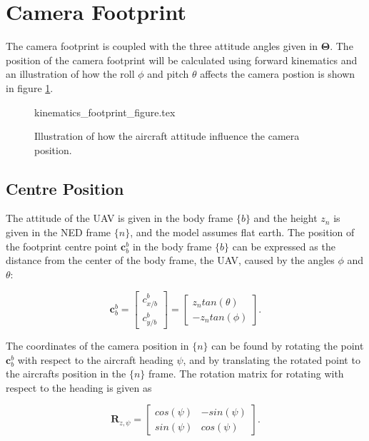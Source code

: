 \section{Camera Footprint}

The camera footprint is coupled with the three attitude angles given in $\bm{\Theta}$. The position of the camera footprint will be calculated using forward kinematics and an illustration of how the roll $\phi$ and pitch $\theta$ affects the camera postion is shown in figure \ref{fig:footprint_centre}.

\begin{figure}
	{kinematics_footprint_figure.tex}
	\caption{Illustration of how the aircraft attitude influence the camera position.}
	\label{fig:footprint_centre}
\end{figure}

\subsection{Centre Position}

The attitude of the UAV is given in the body frame $\{b\}$ and the height $z_n$ is given in the NED frame $\{n\}$, and the model assumes flat earth. The position of the footprint centre point $\mathbf{c}_b^b$ in the body frame $\{b\}$ can be expressed as the distance from the center of the body frame, the UAV, caused by the angles $\phi$ and $\theta$:

\begin{equation}
	\label{eq:camera_position_body}
	\mathbf{c}_b^b =
	\begin{bmatrix}
		c_{x/b}^b \\ c_{y/b}^b
	\end{bmatrix}
	=
	\begin{bmatrix}
		z_n tan(\theta) \\ -z_n tan(\phi)
	\end{bmatrix}.
\end{equation}

The coordinates of the camera position in $\{n\}$ can be found by rotating the point $\mathbf{c}_b^b$ with respect to the aircraft heading $\psi$, and by translating the rotated point to the aircrafts position in the $\{n\}$ frame. The rotation matrix for rotating with respect to the heading is given as

\begin{equation}
	\mathbf{R}_{z,\psi} =
	\begin{bmatrix}
		cos(\psi) & -sin(\psi) \\
		sin(\psi) & cos(\psi)
	\end{bmatrix}.
\end{equation}

